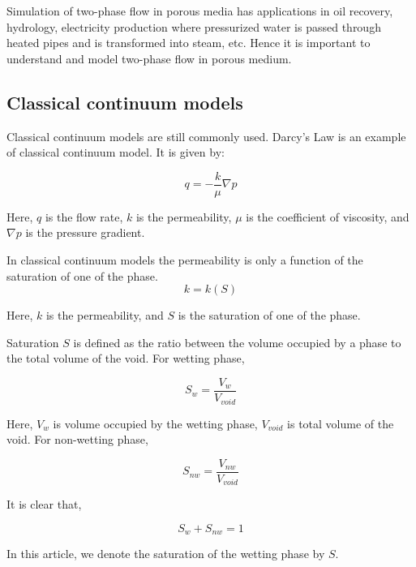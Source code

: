 Simulation of two-phase flow in porous media has applications in oil recovery, hydrology, electricity production where pressurized water is passed through heated pipes and is transformed into steam, etc. Hence it is important to understand and model two-phase flow in porous medium. \cite{labed2012experimental}
	
\subsection{Classical continuum models}

	Classical continuum models are still commonly used. Darcy's Law is an example of classical continuum model. It is given by:
	
	\begin{equation}
		q = -\frac{k}{\mu} \nabla p
		\label{eq:basic-darcy}
	\end{equation}
	
	Here, $q$ is the flow rate,	$k$ is the permeability, $\mu$ is the coefficient of viscosity,	and $\nabla p$ is the pressure gradient.
	
	In classical continuum models the permeability is only a function of the saturation of one of the phase.
	\begin{equation}
		k = k(S)
	\end{equation}
	
	Here, $k$ is the permeability, and $S$ is the saturation of one of the phase.

	Saturation $S$ is defined as the ratio between the volume occupied by a phase to the total volume of the void. For wetting phase,

	\begin{equation}
		S_{w} = \frac{V_{w}}{V_{void}}
	\end{equation}
	
	Here, $V_{w}$ is volume occupied by the wetting phase, $V_{void}$ is total volume of the void. For non-wetting phase,
	
	\begin{equation}
		S_{nw} = \frac{V_{nw}}{V_{void}}
	\end{equation}
	
	It is clear that,
	
	\begin{equation}
		S_{w} + S_{nw} = 1
	\end{equation}
	
	In this article, we denote the saturation of the wetting phase by $S$.
	
